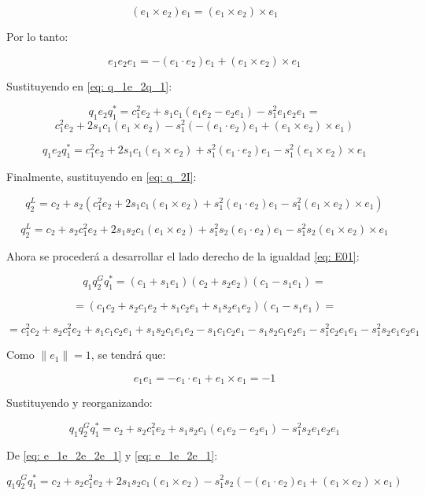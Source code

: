 \documentclass[10pt, a4paper]{report}
\begin{document}
$$ (e_1 \times e_2)e_1 = (e_1 \times e_2) \times e_1 $$

Por lo tanto:

\begin{equation} \label{eq: e_1e_2e_1}
e_1 e_2 e_1 = -(e_1 \cdot e_2)e_1 + (e_1 \times e_2) \times e_1
\end{equation}

Sustituyendo en \eqref{eq: q_1e_2q_1}:

$$ q_1e_2q_1^* = c_1^2e_2 + s_1c_1(e_1e_2 - e_2e_1) - s_1^2e_1e_2e_1 = $$
$$ c_1^2e_2 + 2s_1c_1(e_1 \times e_2) - s_1^2(-(e_1 \cdot e_2)e_1 + (e_1 \times e_2) \times e_1) $$

\begin{equation}
q_1e_2q_1^* = c_1^2e_2 + 2s_1c_1(e_1 \times e_2) + s_1^2(e_1 \cdot e_2)e_1 - s_1^2(e_1 \times e_2) \times e_1
\end{equation}

Finalmente, sustituyendo en \eqref{eq: q_2I}:

$$ q_2^L = c_2 + s_2(c_1^2e_2 + 2s_1c_1(e_1 \times e_2) + s_1^2(e_1 \cdot e_2)e_1 - s_1^2(e_1 \times e_2) \times e_1) $$

\begin{equation} \label{eq: E02}
q_2^L = c_2 + s_2c_1^2e_2 + 2s_1s_2c_1(e_1 \times e_2) + s_1^2s_2(e_1 \cdot e_2)e_1 - s_1^2s_2(e_1 \times e_2) \times e_1
\end{equation}

Ahora se procederá a desarrollar el lado derecho de la igualdad \eqref{eq: E01}:

$$ q_1q_2^Gq_1^* = (c_1 + s_1 e_1)(c_2 + s_2 e_2)(c_1 - s_1 e_1) = $$

$$ = (c_1c_2 + s_2c_1e_2 + s_1c_2e_1 + s_1s_2e_1e_2)(c_1 - s_1 e_1) = $$

$$ = c_1^2c_2 + s_2c_1^2e_2 + s_1c_1c_2e_1 + s_1s_2c_1e_1e_2 - s_1c_1c_2e_1 - s_1s_2c_1e_2e_1 - s_1^2c_2e_1e_1 - s_1^2s_2e_1e_2e_1 $$

Como $\|e_1\| = 1$, se tendrá que:

\begin{equation}
e_1e_1 = -e_1 \cdot e_1 + e_1 \times e_1 = -1
\end{equation}

Sustituyendo y reorganizando:

$$ q_1q_2^Gq_1^* = c_2 + s_2c_1^2e_2 + s_1s_2c_1(e_1e_2 - e_2e_1) - s_1^2s_2e_1e_2e_1 $$

De \eqref{eq: e_1e_2e_2e_1} y \eqref{eq: e_1e_2e_1}:

$$ q_1q_2^Gq_1^* = c_2 + s_2c_1^2e_2 + 2s_1s_2c_1(e_1 \times e_2) - s_1^2s_2(-(e_1 \cdot e_2)e_1 + (e_1 \times e_2) \times e_1) $$
\end{document}
